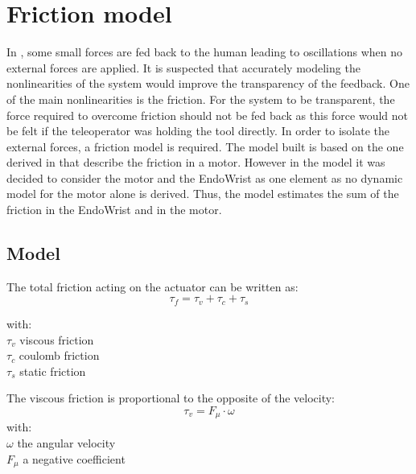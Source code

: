 \section{Friction model}

In , some small forces are fed back to the human leading to oscillations when no external forces are applied. It is suspected that accurately modeling the nonlinearities of the system would improve the transparency of the feedback.  
 One of the main nonlinearities is the friction. For the system to be transparent, the force required to overcome friction should not be fed back as this force would not be felt if the teleoperator was holding the tool directly. In order to isolate the external forces, a friction model is required. The model built is based on the one derived in \cite{force_reflection} that describe the friction in a motor. However in the model it was decided to consider the motor and the EndoWrist as one element as no dynamic model for the motor alone is derived. Thus, the model estimates the sum of the friction in the EndoWrist and in the motor.

\subsection{Model}
The total friction acting on the actuator can be written as:
\vspace{9pt}
\begin{equation}
\tau_f = \tau_v + \tau_c + \tau_s
\label{eq:total_friction}
\end{equation} 

with:\\
\hspace*{8mm} $\tau_v$ viscous friction\\
\hspace*{8mm} $\tau_c$ coulomb friction\\
\hspace*{8mm} $\tau_s$ static friction    


The viscous friction is proportional to the opposite of the velocity:
\begin{equation}
\tau_v = F_\mu \cdot \omega
\label{eq:viscous_friction}
\end{equation}
with:\\
\hspace*{8mm}$\omega$ the angular velocity\\
\hspace*{8mm}$F_\mu$ a negative coefficient\\

